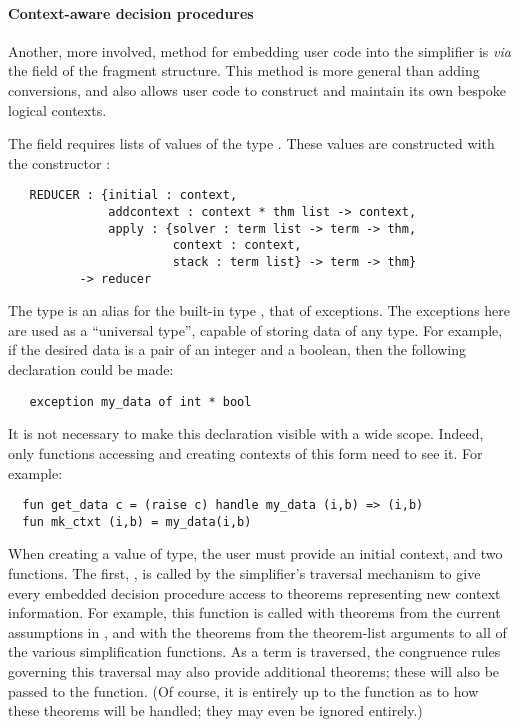 \paragraph{Context-aware decision procedures}
Another, more involved, method for embedding user code into the
simplifier is \emph{via} the  field of the \simpset{}
fragment structure.  This method is more general than adding
conversions, and also allows user code to construct and maintain its
own bespoke logical contexts.

The  field requires lists of values of the type
.  These values are constructed with the
constructor :
\begin{hol}
\begin{verbatim}
   REDUCER : {initial : context,
              addcontext : context * thm list -> context,
              apply : {solver : term list -> term -> thm,
                       context : context,
                       stack : term list} -> term -> thm}
          -> reducer
\end{verbatim}
\end{hol}
The  type is an alias for the built-in \ML{} type
, that of exceptions.  The exceptions here are used as a
``universal type'', capable of storing data of any type.  For example,
if the desired data is a pair of an integer and a boolean, then the
following declaration could be made:
\begin{hol}
\begin{verbatim}
   exception my_data of int * bool
\end{verbatim}
\end{hol}
It is not necessary to make this declaration visible with a wide
scope.  Indeed, only functions accessing and creating contexts of this
form need to see it. For example:
\begin{hol}
\begin{verbatim}
  fun get_data c = (raise c) handle my_data (i,b) => (i,b)
  fun mk_ctxt (i,b) = my_data(i,b)
\end{verbatim}
\end{hol}

When creating a value of  type, the user must provide an
initial context, and two functions.  The first, , is
called by the simplifier's traversal mechanism to give every embedded
decision procedure access to theorems representing new context
information.  For example, this function is called with theorems from
the current assumptions in , and with the theorems
from the theorem-list arguments to all of the various simplification
functions.  As a term is traversed, the congruence rules governing
this traversal may also provide additional theorems; these will also
be passed to the  function.  (Of course, it is entirely
up to the  function as to how these theorems will be
handled; they may even be ignored entirely.)

